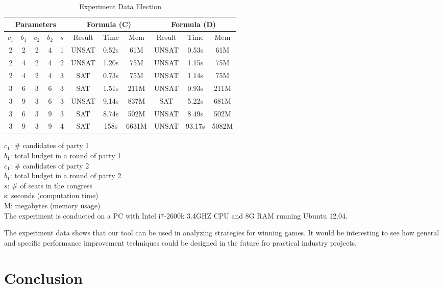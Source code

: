 \documentclass[11pt]{article}
\begin{document}
\begin{table*}[!th]
\caption{Experiment Data Election}
\label{tab.exp.vote}
\begin{center}
\begin{tabular}{c|c|c|c|c||c|c|c||c|c|c} \hline
\multicolumn{5}{c||}{Parameters}
&\multicolumn{3}{c||}{Formula (C)} 
& \multicolumn{3}{c}{Formula (D)}\\ \hline
$c_1$ & $b_1$ & $c_2$ & $b_2$ & $s$ & Result & Time & Mem & Result & Time & Mem\\ \hline
2&2 &2 &4 &1 &UNSAT &0.52s &61M  &UNSAT &0.53s &61M \\
2&4 &2 &4 &2 &UNSAT &1.20s &75M  &UNSAT &1.15s &75M \\
2&4 &2 &4 &3 &SAT   &0.73s &75M  &UNSAT &1.14s &75M \\
3&6 &3 &6 &3 &SAT   &1.51s &211M &UNSAT &0.93s &211M \\
3&9 &3 &6 &3 &UNSAT &9.14s &837M &SAT   &5.22s &681M \\
3&6 &3 &9 &3 &SAT   &8.74s &502M &UNSAT &8.49s &502M \\
3&9 &3 &9 &4 &SAT   &158s  &6631M&UNSAT &93.17s&5082M \\ \hline
\end{tabular}
\hspace*{2mm}
\parbox{75mm}{
$c_1$: \# candidates of party 1\\
$b_1$: total budget in a round of party 1\\
$c_1$: \# candidates of party 2\\
$b_1$: total budget in a round of party 2\\
$s$: \# of seats in the congress\\[2mm] 
s: seconds (computation time)\\
M: megabytes (memory usage) \\[2mm]
The experiment is conducted on a PC with Intel i7-2600k 3.4GHZ CPU 
and 8G RAM running Ubuntu 12.04. 
}
\end{center}
\end{table*}

The experiment data shows that our tool can be used in analyzing strategies 
for winning games.  
It would be interesting to see how general and specific 
performance improvement techniques could be designed in the future fro 
practical industry projects.  



\section{Conclusion \label{sec.conc}}
\end{document}
